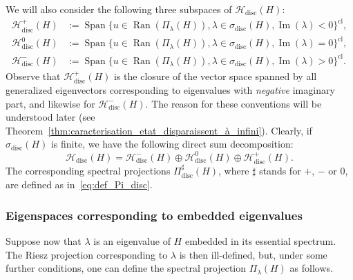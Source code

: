 \documentclass[AHL,Unicode,longabstracts,published]{cedram}
\newcommand{\Hi}{\mathcal{H}}
\newcommand{\disc}{\mathrm{disc}}
\DeclareMathOperator{\Ran}{Ran}
\DeclareMathOperator{\Span}{Span}
\DeclareMathOperator{\im}{Im}
\newcommand{\Hi}{\mathcal{H}}
\DeclareMathOperator{\im}{Im}
\begin{document}
We will also consider the following three subspaces of $\Hi_\disc(H)$:
\begin{align}
\Hi_\disc^+(H)&:=\Span\big\lbrace u\in\Ran\left(\Pi_\lambda(H)\right),\lambda\in\sigma_\disc(H),\im(\lambda)<0\big\rbrace^{\mathrm{cl}},\label{eq:def_etat_discret_+}
\\
\Hi_\disc^0(H)&:=\Span\big\lbrace u\in\Ran\left(\Pi_\lambda(H)\right),\lambda\in\sigma_\disc(H),\im(\lambda)=0\big\rbrace^{\mathrm{cl}},\label{eq:def_etat_discret_0}
\\
\Hi_\disc^-(H)&:=\Span\big\lbrace u\in\Ran\left(\Pi_\lambda(H)\right),\lambda\in\sigma_\disc(H),\im(\lambda)>0\big\rbrace^{\mathrm{cl}}.\label{eq:def_etat_discret_-}
\end{align}
Observe that $\Hi_\disc^+(H)$ is the closure of the vector space spanned by all generalized eigenvectors corresponding to eigenvalues with \emph{negative} imaginary part, and likewise for $\Hi_\disc^-(H)$. The reason for these conventions will be understood later (see Theorem~\ref{thm:caracterisation_etat_disparaissent_à_infini}). Clearly, if $\sigma_{\disc}(H)$ is finite, we have the following direct sum decomposition:
\begin{equation*}
\Hi_\disc(H)=\Hi_\disc^-(H)\oplus\Hi_\disc^0(H)\oplus\Hi_\disc^+(H).
\end{equation*}
The corresponding spectral projections $\Pi_{\disc}^\sharp(H)$, where $\sharp$ stands for $+$, $-$ or $0$, are defined as in~\eqref{eq:def_Pi_disc}.

\subsubsection{Eigenspaces corresponding to embedded eigenvalues}\label{subsubsec:embedded}
Suppose now that $\lambda$ is an eigenvalue of $H$ embedded in its essential spectrum. The Riesz projection corresponding to $\lambda$ is then ill-defined, but, under some further conditions, one can define the spectral projection $\Pi_\lambda(H)$ as follows.
\end{document}
